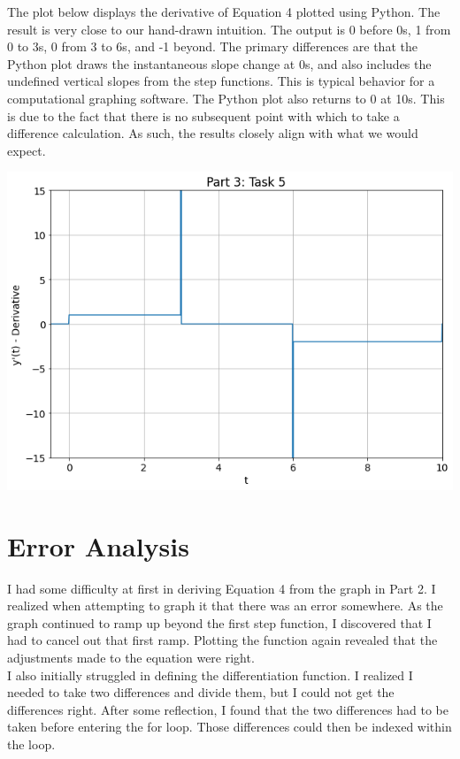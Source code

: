 \documentclass[12pt]{report}
\begin{document}
The plot below displays the derivative of Equation 4 plotted using Python. The result is very close to our hand-drawn intuition. The output is 0 before 0s, 1 from 0 to 3s, 0 from 3 to 6s, and -1 beyond. The primary differences are that the Python plot draws the instantaneous slope change at 0s, and also includes the undefined vertical slopes from the step functions. This is typical behavior for a computational graphing software. The Python plot also returns to 0 at 10s. This is due to the fact that there is no subsequent point with which to take a difference calculation. As such, the results closely align with what we would expect. \\

\begin{center}
    \includegraphics[scale = 0.43]{Lab 2 - Plots/Part3-Task5.png}\\[1.0 cm]
\end{center}

\section{Error Analysis}

I had some difficulty at first in deriving Equation 4 from the graph in Part 2. I realized when attempting to graph it that there was an error somewhere. As the graph continued to ramp up beyond the first step function, I discovered that I had to cancel out that first ramp. Plotting the function again revealed that the adjustments made to the equation were right. \\

I also initially struggled in defining the differentiation function. I realized I needed to take two differences and divide them, but I could not get the differences right. After some reflection, I found that the two differences had to be taken before entering the for loop. Those differences could then be indexed within the loop. \\
\end{document}
